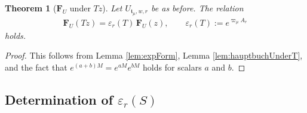 \documentclass[11pt]{article}
\newtheorem{thm}{Theorem}
\begin{document}
    \begin{thm}[$ \mathbf{F}_U $ under $ Tz $]\label{thm:vectorFormUnderT}
        Let $ U_{\mathfrak{t}_\mu, w,r} $ be as before. The relation 
            \begin{eqnarray*}
                \mathbf{F}_U(Tz) = \varepsilon_r(T) \, \mathbf{F}_U(z), \qquad \varepsilon_r(T) := e^{\varpi_\mu A_r}
            \end{eqnarray*}
        holds. 
    \end{thm}
    \begin{proof}
        This follows from Lemma \ref{lem:expForm}, Lemma \ref{lem:hauptbuchUnderT}, and the fact that $ e^{(a+b)M} = e^{aM}e^{bM} $ holds for scalars $ a $ and $b$. 
    \end{proof}


\subsection{Determination of $\varepsilon_r(S)$}
\end{document}
